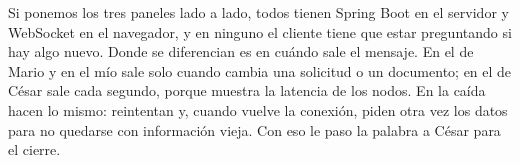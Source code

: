 Si ponemos los tres paneles lado a lado, todos tienen Spring Boot en el servidor y WebSocket en el navegador, y en ninguno el cliente tiene que estar preguntando si hay algo nuevo.
Donde se diferencian es en cuándo sale el mensaje. En el de Mario y en el mío sale solo cuando cambia una solicitud o un documento; en el de César sale cada segundo, porque muestra la latencia de los nodos.
En la caída hacen lo mismo: reintentan y, cuando vuelve la conexión, piden otra vez los datos para no quedarse con información vieja.
Con eso le paso la palabra a César para el cierre.
